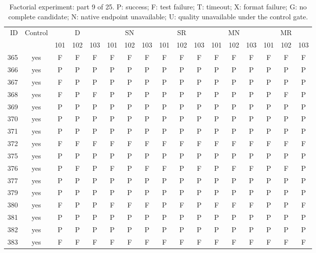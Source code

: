 \begin{table}[p]\centering\footnotesize
\setlength{\tabcolsep}{3pt}
\caption{Factorial experiment: part 9 of 25. P: success; F: test failure; T: timeout; X: format failure; G: no complete candidate; N: native endpoint unavailable; U: quality unavailable under the control gate.}
\begin{tabular*}{\textwidth}{@{\extracolsep{\fill}}rcccccccccccccccc}\toprule
ID & Control & \multicolumn{3}{c}{D} & \multicolumn{3}{c}{SN} & \multicolumn{3}{c}{SR} & \multicolumn{3}{c}{MN} & \multicolumn{3}{c}{MR}\\
\cmidrule(lr){3-5}\cmidrule(lr){6-8}\cmidrule(lr){9-11}\cmidrule(lr){12-14}\cmidrule(lr){15-17}
 & & 101 & 102 & 103 & 101 & 102 & 103 & 101 & 102 & 103 & 101 & 102 & 103 & 101 & 102 & 103\\\midrule
365 & yes & F & F & F & F & F & F & F & F & F & F & F & F & F & F & F\\
366 & yes & P & P & P & P & P & P & P & P & P & P & P & P & P & P & P\\
367 & yes & F & P & P & P & P & P & P & P & P & P & P & P & P & P & P\\
368 & yes & F & P & F & P & P & P & P & P & P & P & P & P & P & F & P\\
369 & yes & P & P & P & P & P & P & P & P & P & P & P & P & P & P & P\\
370 & yes & P & P & P & P & P & P & P & P & P & P & P & P & P & P & P\\
371 & yes & P & P & P & P & P & P & P & P & P & P & P & P & P & P & P\\
372 & yes & F & F & F & F & F & F & F & F & F & F & F & F & F & F & F\\
375 & yes & P & P & P & P & P & P & P & P & P & P & P & P & P & P & P\\
376 & yes & P & F & P & F & P & F & F & P & F & P & F & F & P & F & P\\
377 & yes & P & P & P & P & P & P & P & P & P & P & P & P & P & P & P\\
379 & yes & P & P & P & P & P & P & P & P & P & P & P & P & P & P & P\\
380 & yes & F & P & P & F & F & F & P & F & P & F & F & F & P & P & F\\
381 & yes & P & P & P & P & P & P & P & P & P & P & P & P & P & P & P\\
382 & yes & P & P & P & P & P & P & P & P & P & P & P & P & P & P & P\\
383 & yes & F & F & F & F & F & F & F & F & F & F & F & F & F & F & F\\

\end{tabular*}
\end{table}
